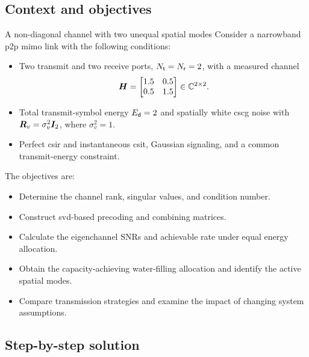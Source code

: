 \subsection{Context and objectives}
\begin{example}{A non-diagonal channel with two unequal spatial modes}
	Consider a narrowband \ac{p2p} \ac{mimo} link with the following conditions:
	\begin{itemize}
		\item Two transmit and two receive ports, $N_{\mathsf{t}}=N_{\mathsf{r}}=2$, with a measured channel
		\begin{equation}
			\bm{H}=\begin{bmatrix}1.5&0.5\\0.5&1.5\end{bmatrix}
			\in\mathbb{C}^{2\times2}.
			\label{eq06:p2p-channel}
		\end{equation}
		\item Total transmit-symbol energy $E_{\mathsf{d}}=2$ and spatially white \ac{cscg} noise with $\bm{R}_v=\sigma_v^2\bm{I}_2$, where $\sigma_v^2=1$.
		\item Perfect \ac{csir} and instantaneous \ac{csit}, Gaussian signaling, and a common transmit-energy constraint.
	\end{itemize}
	
	The objectives are:
	\begin{itemize}
		\item Determine the channel rank, singular values, and condition number.
		\item Construct \ac{svd}-based precoding and combining matrices.
		\item Calculate the eigenchannel SNRs and achievable rate under equal energy allocation.
		\item Obtain the capacity-achieving water-filling allocation and identify the active spatial modes.
		\item Compare transmission strategies and examine the impact of changing system assumptions.
	\end{itemize}
\end{example}

\subsection{Step-by-step solution}

